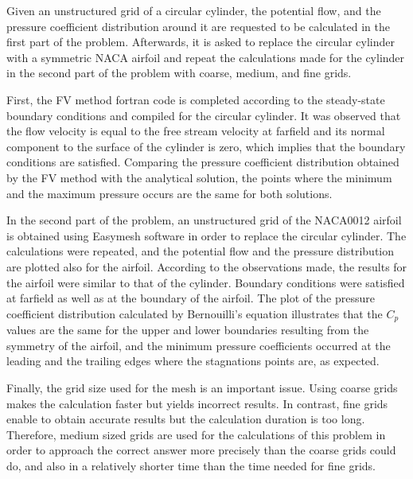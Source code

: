 \documentclass[letterpaper,12pt]{article}
\begin{document}
Given an unstructured grid of a circular cylinder, the potential flow, and the pressure 
coefficient distribution around it are requested to be calculated in the first part of
the problem. Afterwards, it is asked to replace the circular cylinder with a symmetric
NACA airfoil and repeat the calculations made for the cylinder in the second part of the
problem with coarse, medium, and fine grids.

First, the FV method fortran code is completed according to the steady-state boundary
conditions and compiled for the circular cylinder. It was observed that the flow velocity
is equal to the free stream velocity at farfield and its normal component to the surface
of the cylinder is zero, which implies that the boundary conditions are satisfied. Comparing
the pressure coefficient distribution obtained by the FV method with the analytical solution,
the points where the minimum and the maximum pressure occurs are the same for both solutions.

In the second part of the problem, an unstructured grid of the NACA0012 airfoil is obtained
using Easymesh software in order to replace the circular cylinder. The calculations were repeated,
and the potential flow and the pressure distribution are plotted also for the airfoil.
According to the observations made, the results for the airfoil were similar to that of
the cylinder. Boundary conditions were satisfied at farfield as well as at the boundary of
the airfoil. The plot of the pressure coefficient distribution calculated by Bernouilli's
equation illustrates that the $C_{p}$ values are the same for the upper and lower boundaries
resulting from the symmetry of the airfoil, and the minimum pressure coefficients occurred at
the leading and the trailing edges where the stagnations points are, as expected. 

Finally, the grid size used for the mesh is an important issue. Using coarse grids makes the calculation
faster but yields incorrect results. In contrast, fine grids enable to obtain accurate results
but the calculation duration is too long. Therefore, medium sized grids are used for the calculations
of this problem in order to approach the correct answer more precisely than the coarse grids could do,
and also in a relatively shorter time than the time needed for fine grids.
\end{document}
